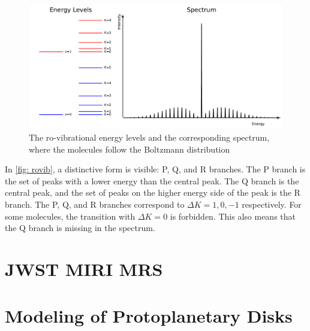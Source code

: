 \documentclass[twoside, single, authoryear, semicolon]{lion-msc}
\newcommand{\4}{$_4$}
\newcommand{\3}{$_3$}
\newcommand{\2}{$_2$}
\begin{document}
\begin{figure}[!ht]
    \centering
    \includegraphics[width=\linewidth]{Figures/RoVibSpectrum.pdf}
    \caption{The ro-vibrational energy levels and the corresponding spectrum, where the molecules follow the Boltzmann distribution}
    \label{fig: rovib}
\end{figure}

In \autoref{fig: rovib}, a distinctive form is visible: P, Q, and R branches. The P branch is the set of peaks with a lower energy than the central peak. The Q branch is the central peak, and the set of peaks on the higher energy side of the peak is the R branch. The P, Q, and R branches correspond to $\Delta K=1, 0, -1$ respectively. For some molecules, the transition with $\Delta K=0$ is forbidden. This also means that the Q branch is missing in the spectrum.

\section{JWST MIRI MRS}


\section{Modeling of Protoplanetary Disks}
\end{document}
